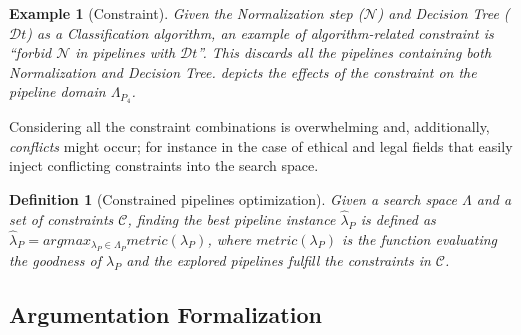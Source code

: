 \documentclass[5p,times]{elsarticle}
\newtheorem{example}{Example}
\newtheorem{definition}{Definition}
\begin{document}

\begin{example}[Constraint]
Given the Normalization step ($\mathcal{N}$) and Decision Tree ($\mathcal{D}t$) as a Classification algorithm, an example of algorithm-related constraint is ``forbid $\mathcal{N}$ in pipelines with $\mathcal{D}t$''.
This discards all the pipelines containing both Normalization and Decision Tree.
 depicts the effects of the constraint on the pipeline domain $\Lambda_{P_4}$.
\label{ex:constraints}
\end{example}

Considering all the constraint combinations is overwhelming and, additionally, \emph{conflicts} might occur; for instance in the case of ethical \cite{boston-house} and legal fields that easily inject conflicting constraints into the search space.

\begin{definition}[Constrained pipelines optimization]
Given a search space $\Lambda$ and a set of constraints $\mathcal{C}$, finding the best pipeline instance $\hat{\lambda}_P$ is defined as $\hat{\lambda}_P = argmax_{\lambda_P \in \Lambda_P} metric(\lambda_P)$, where $metric(\lambda_P)$ is the function evaluating the goodness of $\lambda_P$ and the explored pipelines fulfill the constraints in $\mathcal{C}$.
\end{definition}


\subsection{Argumentation Formalization}
\end{document}
